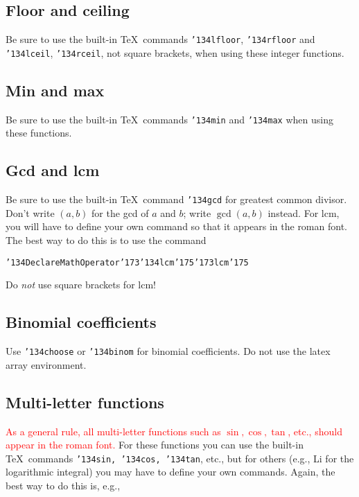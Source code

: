 \documentclass[12pt]{article}
\begin{document}
\subsection{Floor and ceiling}

    Be sure to use the built-in \TeX\ commands
{\tt \char'134lfloor}, {\tt \char'134rfloor} and
{\tt \char'134lceil}, {\tt \char'134rceil}, not square brackets,
when using these integer functions.

\subsection{Min and max}

     Be sure to use the built-in \TeX\ commands
{\tt \char'134min} and {\tt \char'134max} when using these functions.

\subsection{Gcd and lcm}

     Be sure to use the built-in \TeX\ command {\tt\char'134gcd}
for greatest common divisor.  Don't write $(a,b)$ for the gcd of $a$ and
$b$; write $\gcd(a,b)$ instead.  For lcm, you will have to define
your own command so that it appears in the roman font.  The best way
to do this is to use the command

{\tt \char'134DeclareMathOperator\char'173\char'134lcm\char'175\char'173lcm\char'175}

Do {\it not\/} use square brackets for lcm!

\subsection{Binomial coefficients}

      Use {\tt\char'134choose} or {\tt\char'134binom}
for binomial coefficients.  
Do not use the latex array environment.

\subsection{Multi-letter functions}

     \textcolor{red}{As a general rule, all multi-letter functions such as $\sin, \cos, \tan$, etc., should appear in the roman font.}  For these functions you can use
the built-in \TeX\ commands {\tt\char'134sin, \char'134cos, \char'134tan}, etc.,
but for others (e.g., {\rm Li} for the logarithmic integral)
you may have to define your own commands.  Again, the best way to do this
is, e.g., 
\end{document}
